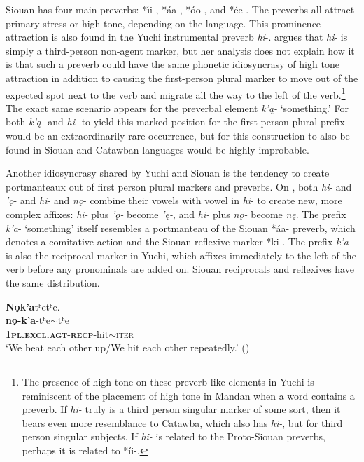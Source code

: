 \documentclass[output=paper]{LSP/langsci}
\begin{document}
Siouan has four main preverbs: *\'\i i-, *\'aa-, *\'oo-, and *\'ee-. The preverbs all attract primary stress or high tone, depending on the language. This prominence attraction is also found in the Yuchi instrumental preverb \emph{hi}-. \citet{Linn2000} argues that \emph{hi}- is simply a third-person non-agent marker, but her analysis does not explain how it is that such a preverb could have the same phonetic idiosyncrasy of high tone attraction in addition to causing the first-person plural marker to move out of the expected spot next to the verb and migrate all the way to the left of the verb.\footnote{The presence of high tone on these preverb-like elements in Yuchi is reminiscent of the placement of high tone in Mandan when a word contains a preverb. If \emph{hi-} truly is a third person singular marker of some sort, then it bears even more resemblance to Catawba, which also has \emph{hi-}, but for third person singular subjects. If \emph{hi-} is related to the Proto-Siouan preverbs, perhaps it is related to *\'ii-.} 
The exact same scenario appears for the preverbal element \emph{k'\k{a}-} `something.' For both \emph{k'\k{a}}- and \emph{hi-} to yield this marked position for the first person plural prefix would be an extraordinarily rare occurrence, but for this construction to also be found in Siouan and Catawban languages would be highly improbable.

Another idiosyncrasy shared by Yuchi and Siouan is the tendency to create portmanteaux out of first person plural markers and preverbs. On , both \emph{hi}- and \emph{'\k{o}}- and \emph{hi}- and \emph{n\k{o}}- combine their vowels with vowel in \emph{hi}- to create new, more complex affixes: \emph{hi-} plus \emph{'\k{o}-} become \emph{'\k{e}-}, and \emph{hi-} plus \emph{n\k{o}-} become \emph{n\k{e}}. The prefix \emph{k'a}- `something' itself resembles a portmanteau of the Siouan *\'aa- preverb, which denotes a comitative action and the Siouan reflexive marker *ki-. The prefix \emph{k'a}- is also the reciprocal marker in Yuchi, which affixes immediately to the left of the verb before any pronominals are added on. Siouan reciprocals and reflexives have the same distribution.

\ea \label{yuchimandan}
	\ea
	\glll  \textbf{N\k{o}k'a}tʰetʰe.\\ 
	\textbf{n\k{o}-k'a}-tʰe$\sim$tʰe\\
			\textbf{\textsc{1pl.excl.agt}}-\textbf{\textsc{recp}}-hit$\sim$\textsc{iter}\\ 
	\glt `We beat each other up/We hit each other repeatedly.' (\citealt[250]{Linn2000})
	
\end{document}
